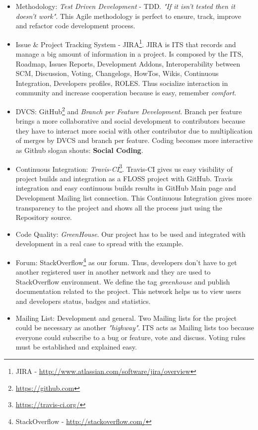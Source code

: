 \documentclass[11pt]{scrartcl}
\begin{document}
\begin{itemize}
	\item Methodology: \emph{Test Driven Development} - TDD. \emph{"If it isn’t tested then it doesn’t work"}. This Agile methodology is perfect to ensure, track, improve and refactor code development process.
	\item Issue \& Project Tracking System - JIRA\footnote{JIRA - \url{http://www.atlassian.com/software/jira/overview}}. JIRA is ITS that records and manage a big amount of information in a project. Is composed by the ITS, Roadmap, Issues Reports, Development Addons, Interoperability between SCM, Discussion, Voting, Changelogs, HowTos, Wikis, Continuous Integration, Developers profiles, ROLES. Thus socialize interaction in community and increase cooperation because is easy, remember \emph{comfort}.
	\item DVCS: GitHub\footnote{\url{https://github.com}} and \emph{Branch per Feature Development}\cite{branch-per-feature}. Branch per feature brings a more collaborative and social development to contributors because they have to interact more social with other contributor due to multiplication of merges by DVCS and branch per feature. Coding becomes more interactive as Github slogan shouts: \textbf{Social Coding}.
	\item Continuous Integration: \emph{Travis-CI}\footnote{\url{https://travis-ci.org/}}. Travis-CI gives us easy visibility of project builds and integration as a FLOSS project with GitHub. Travis integration and easy continuous builds results in GitHub Main page and Development Mailing list connection. This Continuous Integration gives more transparency to the project and shows all the process just using the Repository source.
	\item Code Quality: \emph{GreenHouse}. Our project has to be used and integrated with development in a real case to spread with the example.
	\item Forum: StackOverflow\footnote{StackOverflow - \url{http://stackoverflow.com/}} as our forum. Thus, developers don't have to get another registered user in another network and they are used to StackOverflow environment. We define the tag \emph{greenhouse} and publish documentation related to the project. This network helps us to view users and developers status, badges and statistics.
	\item Mailing List: Development and general. Two Mailing lists for the project could be necessary as another \emph{"highway"}. ITS acts as Mailing lists too because everyone could subscribe to a bug or feature, vote and discuss. Voting rules must be established and explained easy.

\end{itemize}
\end{document}
